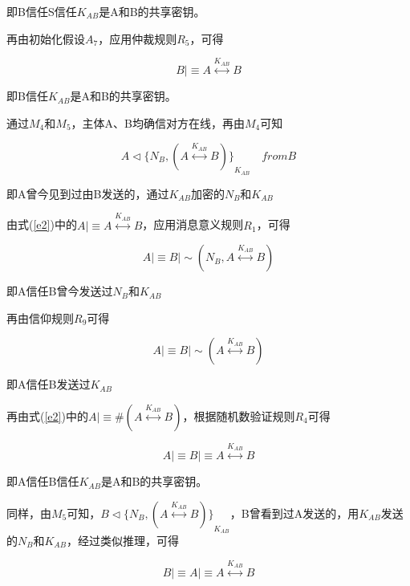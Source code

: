 \documentclass[cs4size,a4pape,UTF8]{ctexart}
\numberwithin{equation}{section}
\numberwithin{table}{section}
\numberwithin{figure}{section}
\begin{document}
即B信任S信任$K_{AB}$是A和B的共享密钥。

再由初始化假设$A_{7}$，应用仲裁规则$R_{5}$，可得

\begin{equation}
B{\lvert\equiv}A\stackrel{K_{AB}}{\longleftrightarrow}B\label{e3}
\end{equation}

即B信任$K_{AB}$是A和B的共享密钥。

通过$M_{4}$和$M_{5}$，主体A、B均确信对方在线，再由$M_{4}$可知

\begin{equation}
A\triangleleft{\{N_{B},(A\stackrel{K_{AB}}{\longleftrightarrow}B)\}}_{K_{AB}}{\quad}from B
\end{equation}

即A曾今见到过由B发送的，通过$K_{AB}$加密的$N_{B}$和$K_{AB}$

由式(\ref{e2})中的$A{\lvert\equiv}A\stackrel{K_{AB}}{\longleftrightarrow}B$，应用消息意义规则$R_{1}$，可得

\begin{equation}
A{\lvert\equiv}B{\lvert\sim}(N_{B},A\stackrel{K_{AB}}{\longleftrightarrow}B)
\end{equation}

即A信任B曾今发送过$N_{B}$和$K_{AB}$

再由信仰规则$R_{9}$可得

\begin{equation}
A{\lvert\equiv}B{\lvert\sim}(A\stackrel{K_{AB}}{\longleftrightarrow}B)
\end{equation}

即A信任B发送过$K_{AB}$

再由式(\ref{e2})中的$A{\lvert\equiv}\#(A\stackrel{K_{AB}}{\longleftrightarrow}B)$，根据随机数验证规则$R_{4}$可得

\begin{equation}
A{\lvert\equiv}B{\lvert\equiv}A\stackrel{K_{AB}}{\longleftrightarrow}B\label{e4}
\end{equation}

即A信任B信任$K_{AB}$是A和B的共享密钥。

同样，由$M_{5}$可知，$B\triangleleft{\{N_{B},(A\stackrel{K_{AB}}{\longleftrightarrow}B)\}}_{K_{AB}}$，B曾看到过A发送的，用$K_{AB}$发送的$N_{B}$和$K_{AB}$，经过类似推理，可得

\begin{equation}
B{\lvert\equiv}A{\lvert\equiv}A\stackrel{K_{AB}}{\longleftrightarrow}B\label{e5}
\end{equation}
\end{document}

